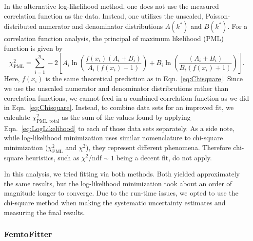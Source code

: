 In the alternative log-likelihood method, one does not use the measured correlation function as the data.
Instead, one utilizes the unscaled, Poisson-distributed numerator and denominator distributions $A(k^*)$ and $B(k^*)$.
For a correlation function analysis, the principal of maximum likelihood (PML) function is given \cite{Ahle:2002mi} by
\begin{equation}
\label{eq:LogLikelihood}
\chi^2_{\mathrm{PML}} = \sum_{i = 1}^{n} 
-2 \left[A_i \ln  \left(\frac{f(x_i) (A_i + B_i)}{A_i(f(x_i) + 1)}\right) + B_i \ln \left(\frac{(A_i + B_i)}{B_i(f(x_i) + 1)}\right)\right].
\end{equation}
Here, $f(x_i)$ is the same theoretical prediction as in Eqn.\ \ref{eq:Chisquare}.
Since we use the unscaled numerator and denominator distribrutions rather than correlation functions, we cannot feed in a combined correlation function as we did in Eqn.\ \ref{eq:Chisquare}. Instead, to combine data sets for an improved fit, we calculate $\chi^2_\mathrm{PML,total}$ as the sum of the values found by applying Eqn.\ \ref{eq:LogLikelihood} to each of those data sets separately.
As a side note, while log-likelihood minimization uses similar nomenclature to chi-square minimization ($\chi^2_\mathrm{PML}$ and $\chi^2$), they represent different phenomena. Therefore chi-square heuristics, such as $\chi^2 / \mathrm{ndf} \sim 1$ being a decent fit, do not apply.

In this analysis, we tried fitting via both methods. Both yielded approximately the same results, but the log-likelihood minimization took about an order of magnitude longer to converge. Due to the run-time issues, we opted to use the chi-square method when making the systematic uncertainty estimates and measuring the final results.

\subsubsection{FemtoFitter}
\label{sec:FemtoFitter}






